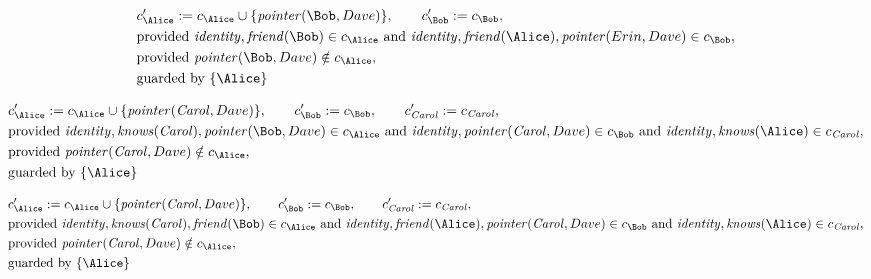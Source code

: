\begin{align*}
&
c'_
{
\Alice
}
 := 
c_
{
\Alice
}
 \cup 
\{
\mathit{\detokenize{
pointer
}}
(
\Bob
,
Dave
)
\}
, \qquad 
c'_
{
\Bob
}
 := 
c_
{
\Bob
}
,\\
&
\text{provided } 
\mathit{\detokenize{
identity
}}
,
\mathit{\detokenize{
friend
}}
(
\Bob
)
 \in c_
{
\Alice
}
 \text{ and } 
\mathit{\detokenize{
identity
}}
,
\mathit{\detokenize{
friend
}}
(
\Alice
)
,
\mathit{\detokenize{
pointer
}}
(
Erin
,
Dave
)
 \in c_
{
\Bob
}
,\\
&
\text{provided } 
\mathit{\detokenize{
pointer
}}
(
\Bob
,
Dave
)
 \notin c_
{
\Alice
}
,\\
&
\text{guarded by } \{
\Alice
\}
\end{align*}

\begin{align*}
&
c'_
{
\Alice
}
 := 
c_
{
\Alice
}
 \cup 
\{
\mathit{\detokenize{
pointer
}}
(
\mathit{Carol}
,
Dave
)
\}
, \qquad 
c'_
{
\Bob
}
 := 
c_
{
\Bob
}
, \qquad 
c'_
{
\mathit{Carol}
}
 := 
c_
{
\mathit{Carol}
}
,\\
&
\text{provided } 
\mathit{\detokenize{
identity
}}
,
\mathit{\detokenize{
knows
}}
(
\mathit{Carol}
)
,
\mathit{\detokenize{
pointer
}}
(
\Bob
,
Dave
)
 \in c_
{
\Alice
}
 \text{ and } 
\mathit{\detokenize{
identity
}}
,
\mathit{\detokenize{
pointer
}}
(
\mathit{Carol}
,
Dave
)
 \in c_
{
\Bob
}
 \text{ and } 
\mathit{\detokenize{
identity
}}
,
\mathit{\detokenize{
knows
}}
(
\Alice
)
 \in c_
{
\mathit{Carol}
}
,\\
&
\text{provided } 
\mathit{\detokenize{
pointer
}}
(
\mathit{Carol}
,
Dave
)
 \notin c_
{
\Alice
}
,\\
&
\text{guarded by } \{
\Alice
\}
\end{align*}

\begin{align*}
&
c'_
{
\Alice
}
 := 
c_
{
\Alice
}
 \cup 
\{
\mathit{\detokenize{
pointer
}}
(
\mathit{Carol}
,
Dave
)
\}
, \qquad 
c'_
{
\Bob
}
 := 
c_
{
\Bob
}
, \qquad 
c'_
{
\mathit{Carol}
}
 := 
c_
{
\mathit{Carol}
}
,\\
&
\text{provided } 
\mathit{\detokenize{
identity
}}
,
\mathit{\detokenize{
knows
}}
(
\mathit{Carol}
)
,
\mathit{\detokenize{
friend
}}
(
\Bob
)
 \in c_
{
\Alice
}
 \text{ and } 
\mathit{\detokenize{
identity
}}
,
\mathit{\detokenize{
friend
}}
(
\Alice
)
,
\mathit{\detokenize{
pointer
}}
(
\mathit{Carol}
,
Dave
)
 \in c_
{
\Bob
}
 \text{ and } 
\mathit{\detokenize{
identity
}}
,
\mathit{\detokenize{
knows
}}
(
\Alice
)
 \in c_
{
\mathit{Carol}
}
,\\
&
\text{provided } 
\mathit{\detokenize{
pointer
}}
(
\mathit{Carol}
,
Dave
)
 \notin c_
{
\Alice
}
,\\
&
\text{guarded by } \{
\Alice
\}
\end{align*}
